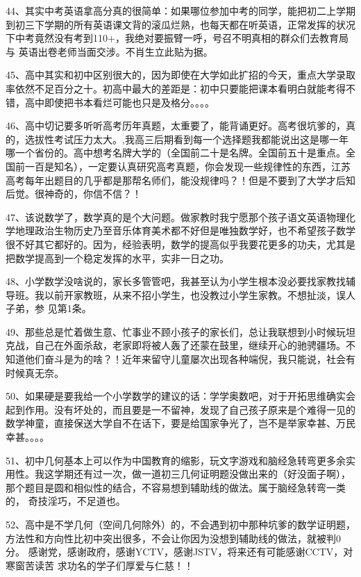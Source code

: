 \documentclass[11pt]{ctexart}
\begin{document}
{{{{44、其实中考英语拿高分真的很简单：如果哪位参加中考的同学，能把初二上学期
到初三下学期的所有英语课文背的滚瓜烂熟，也每天都在听英语，正常发挥的状况
下中考竟然没有考到110+，我绝对要振臂一呼，号召不明真相的群众们去教育局与
英语出卷老师当面交涉。不肖生立此贴为据。


45、高中其实和初中区别很大的，因为即使在大学如此扩招的今天，重点大学录取
率依然不足百分之十。初高中最大的差距是：初中只要能把课本看明白就能考得不
错，高中即使把书本看烂可能也只是及格分。。。。


46、高中切记要多听听高考历年真题，太重要了，能背诵更好。高考很坑爹的，真
的，选拔性考试压力太大。,我高三后期看到每一个选择题我都能说出这是哪一年
哪一个省份的。高中想考名牌大学的（全国前二十是名牌。全国前五十是重点。全
国前一百是知名），一定要认真研究高考真题，你会发现一些规律性的东西，江苏
高考每年出题目的几乎都是那帮名师们，能没规律吗？！但是不要到了大学才后知
后觉。很神奇的，你信不信？！


47、该说数学了，数学真的是个大问题。做家教时我宁愿那个孩子语文英语物理化
学地理政治生物历史乃至音乐体育美术都不好但是唯独数学好，也不希望孩子数学
很不好其它都好的。因为，经验表明，数学的提高似乎我要花更多的功夫，尤其是
把数学提高到一个稳定发挥的水平，实非一日之功。


48、小学数学没啥说的，家长多管管吧，我甚至认为小学生根本没必要找家教找辅
导班。我以前开家教班，从来不招小学生，也没教过小学生家教。不想扯淡，误人子弟，参
见第1条。

49、那些总是忙着做生意、忙事业不顾小孩子的家长们，总让我联想到小时候玩坦
克战，自己在外面杀敌，老家即将被人轰了还蒙在鼓里，继续开心的驰骋疆场。不
知道他们奋斗是为的啥？！近年来留守儿童屡次出现各种端倪，我只能说，社会有
时候真无奈。


50、如果硬是要我给一个小学数学的建议的话：学学奥数吧，对于开拓思维确实会
起到作用。没有坏处的，而且要是一不留神，发现了自己孩子原来是个难得一见的
数学神童，直接保送大学自不在话下，要是给国家争光了，岂不是举家幸甚、万民
幸甚。。。。


51、初中几何基本上可以作为中国教育的缩影，玩文字游戏和脑经急转弯更多余实
用性。我这学期还有过一次，做一道初三几何证明题没做出来的（好没面子啊），
那个题目是圆和相似性的结合，不容易想到辅助线的做法。属于脑经急转弯一类的，
奇技淫巧，不足道也。


52、高中是不学几何（空间几何除外）的，不会遇到初中那种坑爹的数学证明题，
方法性和方向性比初中突出很多，不会让你因为没想到辅助线的做法，就被判0分。
感谢党，感谢政府，感谢YCTV，感谢JSTV，将来还有可能感谢CCTV，对寒窗苦读苦
求功名的学子们厚爱与仁慈！！


}}}}
\end{document}
